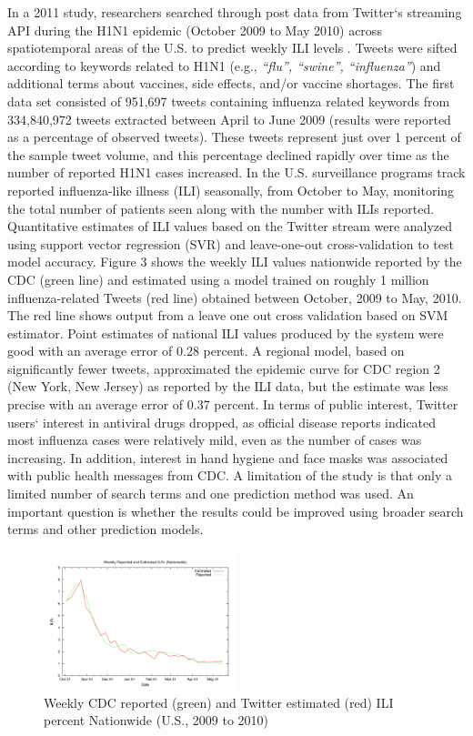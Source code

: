 \documentclass[sigconf]{acmart}
\begin{document}
In a 2011 study, researchers searched through post data from Twitter`s streaming API 
during the H1N1 epidemic (October 2009 to May 2010) across spatiotemporal areas of the 
U.S. to predict weekly ILI levels \cite{signorini11}. Tweets were sifted according to 
keywords related to H1N1 (e.g., {\it ``flu'', ``swine'', ``influenza''}) and additional 
terms about vaccines, side effects, and/or vaccine shortages. The first data set consisted 
of 951,697 tweets containing influenza related keywords from 334,840,972 tweets extracted 
between April to June 2009 (results were reported as a percentage of observed tweets). 
These tweets represent just over 1 percent of the sample tweet volume, and this percentage 
declined rapidly over time as the number of reported H1N1 cases increased. In the U.S. 
surveillance programs track reported influenza-like illness (ILI) seasonally, from October 
to May, monitoring the total number of patients seen along with the number with ILIs 
reported. Quantitative estimates of ILI values based on the Twitter stream were analyzed 
using support vector regression (SVR) and leave-one-out cross-validation to test model 
accuracy. Figure 3 shows the weekly ILI values nationwide reported by the CDC (green line)
and estimated using a model trained on roughly 1 million influenza-related Tweets (red line)
obtained between October, 2009 to May, 2010. The red line shows output from a leave one out 
cross validation based on SVM estimator. Point estimates of national ILI values produced 
by the system were good with an average error of 0.28 percent. A regional model, based on 
significantly fewer tweets, approximated the epidemic curve for CDC region 2 (New York, 
New Jersey) as reported by the ILI data, but the estimate was less precise with an average
error of 0.37 percent. In terms of public interest, Twitter users` interest in antiviral 
drugs dropped, as official disease reports indicated most influenza cases were relatively 
mild, even as the number of cases was increasing. In addition, interest in hand hygiene 
and face masks was associated with public health messages from CDC. A limitation of the 
study is that only a limited number of search terms and one prediction method was used. 
An important question is whether the results could be improved using broader search terms 
and other prediction models. 

\begin{figure}
  \centering
  \includegraphics[width=0.5\textwidth]{images/Figure3.pdf}
  \caption{Weekly CDC reported (green) and Twitter estimated (red) ILI percent 
  Nationwide (U.S., 2009 to 2010) \cite{signorini11}} 
  \label{fig:Figure3} 
\end{figure}
\end{document}
